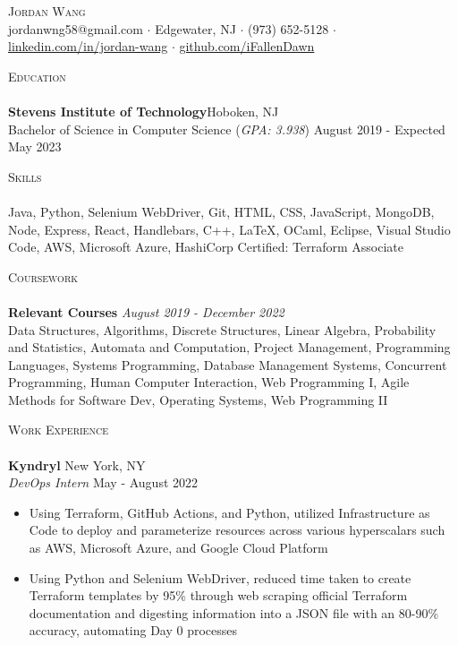 \documentclass[10pt]{article}
\newcommand{\lineunder} {
    \vspace*{-8pt} \\
    \hspace*{-18pt} \hrulefill \\
}
\newcommand{\header} [1] {
    {\hspace*{-18pt}\vspace*{6pt} \textsc{#1}}
    \vspace*{-6pt} \lineunder
}
\begin{document}
\vspace*{-40pt}

    

\vspace*{2pt}
\begin{center}
	{\Huge \scshape {Jordan Wang}}\\
	\vspace{2mm}
	jordanwng58@gmail.com $\cdot$ Edgewater, NJ $\cdot$ (973) 652-5128 $\cdot$ \href{https://www.linkedin.com/in/jordan-wang/}{linkedin.com/in/jordan-wang} $\cdot$ \href{https://github.com/iFallenDawn}{github.com/iFallenDawn} \\
\end{center}
\header{Education}
\textbf{Stevens Institute of Technology}\hfill Hoboken, NJ\\
Bachelor of Science in Computer Science (\textit{GPA: 3.938}) \hfill August 2019 - Expected May 2023\\
\vspace{2mm}

\header{Skills}
	Java, Python, Selenium WebDriver, Git, HTML, CSS, JavaScript, MongoDB, Node, Express, React, Handlebars, C++, \LaTeX, OCaml, Eclipse, Visual Studio Code, AWS, Microsoft Azure, HashiCorp Certified: Terraform Associate
\vspace{2mm}

\header{Coursework}
{\textbf{Relevant Courses}} {\sl August 2019 - December 2022} \hfill 
\\
Data Structures, Algorithms, Discrete Structures, Linear Algebra, Probability and Statistics, Automata and Computation, Project Management, Programming Languages, Systems Programming, Database Management Systems, Concurrent Programming, Human Computer Interaction, Web Programming I, Agile Methods for Software Dev, Operating Systems, Web Programming II\\
\vspace{2mm}

\header{Work Experience}
\textbf{Kyndryl} \hfill New York, NY\\
\textit{DevOps Intern} \hfill May - August 2022\\
\vspace{-1mm}
\begin{itemize}[noitemsep,parsep=0pt,partopsep=0pt]\itemsep 1pt
    \item Using Terraform, GitHub Actions, and Python, utilized Infrastructure as Code to deploy and parameterize resources across various hyperscalars such as AWS, Microsoft Azure, and Google Cloud Platform
    \item Using Python and Selenium WebDriver, reduced time taken to create Terraform templates by 95\% through web scraping official Terraform documentation and digesting information into a JSON file with an 80-90\% accuracy, automating Day 0 processes
\end{itemize}
\end{document}
